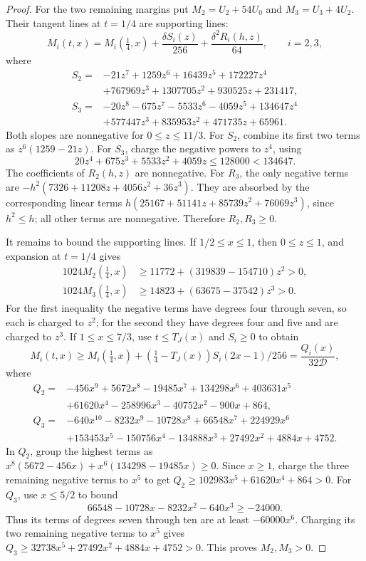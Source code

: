 \begin{proof}
For the two remaining margins put
$M_2=U_2+54U_0$ and $M_3=U_3+4U_2$.
Their tangent lines at $t=1/4$ are supporting lines:
\[
 M_i(t,x)=M_i(\tfrac14,x)+\frac{\delta S_i(z)}{256}
                  +\frac{\delta^2R_i(h,z)}{64},\qquad i=2,3,
\]
where
\begin{align*}
 S_2={}&-21z^7+1259z^6+16439z^5+172227z^4\\
          &+767969z^3+1307705z^2+930525z+231417,\\
 S_3={}&-20z^8-675z^7-5533z^6-4059z^5+134647z^4\\
          &+577447z^3+835953z^2+471735z+65961.
\end{align*}
Both slopes are nonnegative for $0\le z\le11/3$.
For $S_2$, combine its first two terms as $z^6(1259-21z)$.
For $S_3$, charge the negative powers to $z^4$, using
\[
 20z^4+675z^3+5533z^2+4059z\le128000<134647.
\]
The coefficients of $R_2(h,z)$ are nonnegative.
For $R_3$, the only negative terms are
$-h^2(7326+11208z+4056z^2+36z^3)$.
They are absorbed by the corresponding linear terms
$h(25167+51141z+85739z^2+76069z^3)$, since $h^2\le h$;
all other terms are nonnegative. Therefore $R_2,R_3\ge0$.

It remains to bound the supporting lines. If $1/2\le x\le1$, then $0\le z\le1$,
and expansion at $t=1/4$ gives
\begin{align*}
 1024M_2(\tfrac14,x)&\ge11772+(319839-154710)z^2>0,\\
 1024M_3(\tfrac14,x)&\ge14823+(63675-37542)z^3>0.
\end{align*}
For the first inequality the negative terms have degrees four through seven,
so each is charged to $z^2$; for the second they have degrees four and five
and are charged to $z^3$.
If $1\le x\le7/3$, use $t\le T_J(x)$ and $S_i\ge0$ to obtain
\[
 M_i(t,x)\ge M_i(\tfrac14,x)
        +(\tfrac14-T_J(x))S_i(2x-1)/256
        =\frac{Q_i(x)}{32\mathcal D},
\]
where
\begin{align*}
 Q_2={}&-456x^9+5672x^8-19485x^7+134298x^6+403631x^5\\
       &+61620x^4-258996x^3-40752x^2-900x+864,\\
 Q_3={}&-640x^{10}-8232x^9-10728x^8+66548x^7+224929x^6\\
       &+153453x^5-150756x^4-134888x^3+27492x^2+4884x+4752.
\end{align*}
In $Q_2$, group the highest terms as
$x^8(5672-456x)+x^6(134298-19485x)\ge0$.
Since $x\ge1$, charge the three remaining negative terms to $x^5$ to get
$Q_2\ge102983x^5+61620x^4+864>0$.
For $Q_3$, use $x\le5/2$ to bound
\[
 66548-10728x-8232x^2-640x^3\ge-24000.
\]
Thus its terms of degrees seven through ten are at least $-60000x^6$.
Charging its two remaining negative terms to $x^5$ gives
$Q_3\ge32738x^5+27492x^2+4884x+4752>0$.
This proves $M_2,M_3>0$.


\end{proof}
